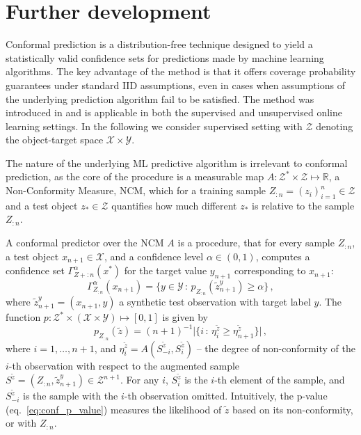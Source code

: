 \documentclass[a4paper,14pt]{extarticle}
\newcommand{\Ycal}{\mathcal{Y}}
\newcommand{\Zcal}{\mathcal{Z}}
\newcommand{\Xcal}{\mathcal{X}}
\newcommand{\Real}{\mathbb{R}}
\begin{document}

\section{Further development} %
\label{sec:further_development}




Conformal prediction is a distribution-free technique designed to yield a statistically
valid confidence sets for predictions made by machine learning algorithms. The key
advantage of the method is that it offers coverage probability guarantees under standard
IID assumptions, even in cases when assumptions of the underlying prediction algorithm
fail to be satisfied. The method was introduced in \cite{vovk2005} and is applicable
in both the supervised and unsupervised online learning settings. In the following
we consider supervised setting with $\Zcal$ denoting the object-target space $\Xcal \times \Ycal$.

The nature of the underlying ML predictive algorithm is irrelevant to conformal
prediction, as the core of the procedure is a measurable map $A: \Zcal^*\times \Zcal \mapsto \Real$,
a Non-Conformity Measure, NCM, which for a training sample $Z_{:n}=(z_i)_{i=1}^n\in\Zcal$
and a test object $z_* \in \Zcal$ quantifies how much different $z_*$ is relative
to the sample $Z_{:n}$.

A conformal predictor over the NCM $A$ is a procedure, that for every sample $Z_{:n}$,
a test object $x_{n+1} \in \Xcal$, and a confidence level $\alpha\in(0,1)$, computes
a confidence set $\Gamma_{Z+{:n}}^\alpha(x^*)$ for the target value $y_{n+1}$ corresponding
to $x_{n+1}$:
\begin{equation} \label{eq:conf_pred_set}
  \Gamma_{Z_{:n}}^\alpha(x_{n+1})
    = \bigl\{ y\in \Ycal \,:\, p_{Z_{:n}}(\tilde{z}^y_{n+1}) \geq \alpha \bigr\} \,,
\end{equation}
where $\tilde{z}^y_{n+1} = (x_{n+1}, y)$ a synthetic test observation with target
label $y$. The function $p:\Zcal^*\times (\Xcal\times \Ycal)\mapsto [0,1]$ is given
by
\begin{equation} \label{eq:conf_p_value}
  p_{Z_{:n}}(\tilde{z})
    = (n+1)^{-1} \bigl\lvert\{ i \,:\,
      \eta_i^{\tilde{z}} \geq \eta_{n+1}^{\tilde{z}} \}\bigr\rvert \,,
\end{equation}
where $i=1,\ldots, n+1$, and $\eta_i^{\tilde{z}} = A(S^{\tilde{z}}_{-i}, S^{\tilde{z}}_i)$
-- the degree of non-conformity of the $i$-th observation with respect to the augmented
sample $S^{\tilde{z}} = (Z_{:n}, {\tilde{z}}^y_{n+1}) \in \Zcal^{n+1}$. For any $i$,
$S^{\tilde{z}}_i$ is the $i$-th element of the sample, and $S^{\tilde{z}}_{-i}$ is
the sample with the $i$-th observation omitted. Intuitively, the p-value (eq.~\ref{eq:conf_p_value})
measures the likelihood of $\tilde{z}$ based on its non-conformity, or with $Z_{:n}$.
\end{document}
